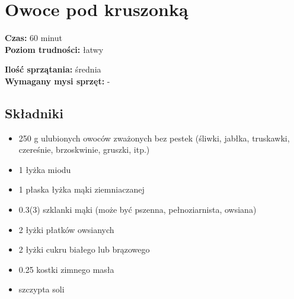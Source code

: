 \documentclass[a4paper,10pt]{book}
\begin{document}
\section{Owoce pod kruszonką}
\bigskip
\small
\begin{minipage}{0.45\textwidth}
    \noindent \textbf{Czas:} 60 minut \\
    \textbf{Poziom trudności:} łatwy
\end{minipage}
\begin{minipage}{0.45\textwidth}
    \noindent \textbf{Ilość sprzątania:} średnia\\
    \textbf{Wymagany mysi sprzęt:} -
\end{minipage}
\normalsize
\vspace{0.5cm}

\begin{multicols}{2}

\subsection*{Składniki}
\begin{itemize}
    \item 250 g ulubionych owoców zważonych bez pestek (śliwki, jabłka, truskawki, czereśnie, brzoskwinie, gruszki, itp.)
    \item 1 łyżka miodu
    \item 1 płaska łyżka mąki ziemniaczanej
    \item 0.3(3) szklanki mąki (może być pszenna, pełnoziarnista, owsiana)
    \item 2 łyżki płatków owsianych 
    \item 2 łyżki cukru białego lub brązowego
    \item 0.25 kostki zimnego masła
    \item szczypta soli    
\end{itemize}

\columnbreak

\begin{figure}[H]
    \centering
\end{figure}
\end{multicols}
\end{document}
